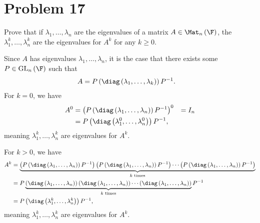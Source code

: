\documentclass[10pt]{mypackage}
\begin{document}
\section{Problem 17}%
\begin{problem}
  Prove that if $\lambda_1,\dots,\lambda_n$ are the eigenvalues of a matrix $A\in \Mat_{n}\left(\F\right)$, the $\lambda_1^k,\dots,\lambda_n^{k}$ are the eigenvalues for $A^k$ for any $k\geq 0$.
\end{problem}
\begin{solution}
  Since $A$ has eigenvalues $\lambda_1,\dots,\lambda_n$, it is the case that there exists some $P\in \text{GL}_{n}\left(\F\right)$ such that
  \begin{align*}
    A &= P\left(\diag\left(\lambda_1,\dots,\lambda_k\right)\right)P^{-1}.
  \end{align*}
  For $k = 0$, we have
  \begin{align*}
    A^{0}  &= \left(P\left(\diag\left(\lambda_1,\dots,\lambda_n\right)\right)P^{-1}\right)^{0}
           &= I_n\\
           &= P\left(\diag\left(\lambda_1^{0},\dots,\lambda_n^{0}\right)\right)P^{-1},
  \end{align*}
  meaning $\lambda_1^k,\dots,\lambda_n^k$ are eigenvalues for $A^k$.\newline

  For $k > 0$, we have
  \begin{align*}
    A^{k} &= \underbrace{\left(P\left(\diag\left(\lambda_1,\dots,\lambda_n\right)\right)P^{-1}\right)\left(P\left(\diag\left(\lambda_1,\dots,\lambda_n\right)\right)P^{-1}\right)\cdots \left(P\left(\diag\left(\lambda_1,\dots,\lambda_n\right)\right)P^{-1}\right)}_{\text{$k$ times}}\\
          &= P\underbrace{\left(\diag\left(\lambda_1,\dots,\lambda_n\right)\right)\left(\diag\left(\lambda_1,\dots,\lambda_n\right)\right)\cdots\left(\diag\left(\lambda_1,\dots,\lambda_n\right)\right)}_{\text{$k$ times}}P^{-1}\\
          &= P\left(\diag\left(\lambda_1^{k},\dots,\lambda_n^{k}\right)\right)P^{-1},
  \end{align*}
  meaning $\lambda_1^k,\dots,\lambda_n^{k}$ are eigenvalues for $A^{k}$.
\end{solution}
\end{document}
